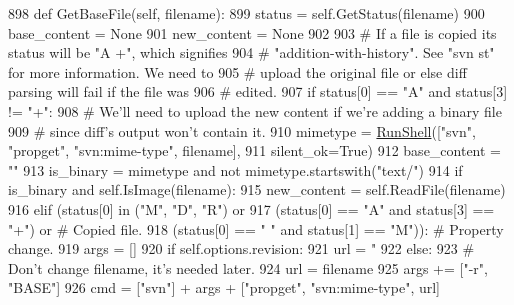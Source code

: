 \begin{DoxyCode}
898   \textcolor{keyword}{def }GetBaseFile(self, filename):
899     status = self.GetStatus(filename)
900     base\_content = \textcolor{keywordtype}{None}
901     new\_content = \textcolor{keywordtype}{None}
902 
903     \textcolor{comment}{# If a file is copied its status will be "A  +", which signifies}
904     \textcolor{comment}{# "addition-with-history".  See "svn st" for more information.  We need to}
905     \textcolor{comment}{# upload the original file or else diff parsing will fail if the file was}
906     \textcolor{comment}{# edited.}
907     \textcolor{keywordflow}{if} status[0] == \textcolor{stringliteral}{"A"} \textcolor{keywordflow}{and} status[3] != \textcolor{stringliteral}{"+"}:
908       \textcolor{comment}{# We'll need to upload the new content if we're adding a binary file}
909       \textcolor{comment}{# since diff's output won't contain it.}
910       mimetype = \hyperlink{namespaceupload_adddc423c49132e8879cbb25d6be2cf11}{RunShell}([\textcolor{stringliteral}{"svn"}, \textcolor{stringliteral}{"propget"}, \textcolor{stringliteral}{"svn:mime-type"}, filename],
911                           silent\_ok=\textcolor{keyword}{True})
912       base\_content = \textcolor{stringliteral}{""}
913       is\_binary = mimetype \textcolor{keywordflow}{and} \textcolor{keywordflow}{not} mimetype.startswith(\textcolor{stringliteral}{"text/"})
914       \textcolor{keywordflow}{if} is\_binary \textcolor{keywordflow}{and} self.IsImage(filename):
915         new\_content = self.ReadFile(filename)
916     \textcolor{keywordflow}{elif} (status[0] \textcolor{keywordflow}{in} (\textcolor{stringliteral}{"M"}, \textcolor{stringliteral}{"D"}, \textcolor{stringliteral}{"R") or}
917 \textcolor{stringliteral}{          (status[0] == "A"} \textcolor{keywordflow}{and} status[3] == \textcolor{stringliteral}{"+"}) \textcolor{keywordflow}{or}  \textcolor{comment}{# Copied file.}
918           (status[0] == \textcolor{stringliteral}{" "} \textcolor{keywordflow}{and} status[1] == \textcolor{stringliteral}{"M"})):  \textcolor{comment}{# Property change.}
919       args = []
920       \textcolor{keywordflow}{if} self.options.revision:
921         url = \textcolor{stringliteral}{"%
922       \textcolor{keywordflow}{else}:
923         \textcolor{comment}{# Don't change filename, it's needed later.}
924         url = filename
925         args += [\textcolor{stringliteral}{"-r"}, \textcolor{stringliteral}{"BASE"}]
926       cmd = [\textcolor{stringliteral}{"svn"}] + args + [\textcolor{stringliteral}{"propget"}, \textcolor{stringliteral}{"svn:mime-type"}, url]
}
\end{DoxyCode}
